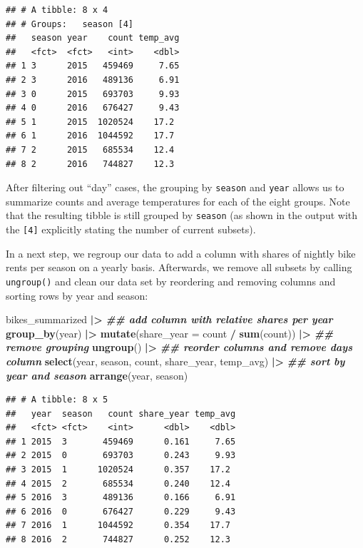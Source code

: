 \documentclass[
]{krantz}
\makeatletter
\newenvironment{Shaded}{\begin{snugshade}}{\end{snugshade}}
\newcommand{\AttributeTok}[1]{\textcolor[rgb]{0.27,0.27,0.27}{#1}}
\newcommand{\DocumentationTok}[1]{\textcolor[rgb]{0.37,0.37,0.37}{\textbf{\textit{#1}}}}
\newcommand{\FunctionTok}[1]{\textcolor[rgb]{0.27,0.27,0.27}{\textbf{#1}}}
\newcommand{\NormalTok}[1]{#1}
\newcommand{\SpecialCharTok}[1]{\textcolor[rgb]{0.43,0.43,0.43}{\textbf{#1}}}
\newenvironment{kframe}{%
\medskip{}
\setlength{\fboxsep}{.8em}
 \def\at@end@of@kframe{}%
 \ifinner\ifhmode%
  \def\at@end@of@kframe{\end{minipage}}%
  \begin{minipage}{\columnwidth}%
 \fi\fi%
 \def\FrameCommand##1{\hskip\@totalleftmargin \hskip-\fboxsep
 \colorbox{shadecolor}{##1}\hskip-\fboxsep
     \hskip-\linewidth \hskip-\@totalleftmargin \hskip\columnwidth}%
 \MakeFramed {\advance\hsize-\width
   \@totalleftmargin\z@ \linewidth\hsize
   \@setminipage}}%
 {\par\unskip\endMakeFramed%
 \at@end@of@kframe}
\renewenvironment{Shaded}{\begin{kframe}}{\end{kframe}}
\makeatother
\begin{document}
\begin{verbatim}
## # A tibble: 8 x 4
## # Groups:   season [4]
##   season year    count temp_avg
##   <fct>  <fct>   <int>    <dbl>
## 1 3      2015   459469     7.65
## 2 3      2016   489136     6.91
## 3 0      2015   693703     9.93
## 4 0      2016   676427     9.43
## 5 1      2015  1020524    17.2 
## 6 1      2016  1044592    17.7 
## 7 2      2015   685534    12.4 
## 8 2      2016   744827    12.3
\end{verbatim}

After filtering out ``day'' cases, the grouping by \texttt{season} and \texttt{year} allows us to summarize counts and average temperatures for each of the eight groups. Note that the resulting tibble is still grouped by \texttt{season} (as shown in the output with the \texttt{{[}4{]}} explicitly stating the number of current subsets).

In a next step, we regroup our data to add a column with shares of nightly bike rents per season on a yearly basis. Afterwards, we remove all subsets by calling \texttt{ungroup()} and clean our data set by reordering and removing columns and sorting rows by year and season:

\begin{Shaded}
\begin{Highlighting}[]
\NormalTok{bikes\_summarized }\SpecialCharTok{|\textgreater{}} 
  \DocumentationTok{\#\# add column with relative shares per year}
  \FunctionTok{group\_by}\NormalTok{(year) }\SpecialCharTok{|\textgreater{}} 
  \FunctionTok{mutate}\NormalTok{(}\AttributeTok{share\_year =}\NormalTok{ count }\SpecialCharTok{/} \FunctionTok{sum}\NormalTok{(count)) }\SpecialCharTok{|\textgreater{}} 
  \DocumentationTok{\#\# remove grouping}
  \FunctionTok{ungroup}\NormalTok{() }\SpecialCharTok{|\textgreater{}} 
  \DocumentationTok{\#\# reorder columns and remove days column}
  \FunctionTok{select}\NormalTok{(year, season, count, share\_year, temp\_avg) }\SpecialCharTok{|\textgreater{}} 
  \DocumentationTok{\#\# sort by year and season}
  \FunctionTok{arrange}\NormalTok{(year, season) }
\end{Highlighting}
\end{Shaded}

\begin{verbatim}
## # A tibble: 8 x 5
##   year  season   count share_year temp_avg
##   <fct> <fct>    <int>      <dbl>    <dbl>
## 1 2015  3       459469      0.161     7.65
## 2 2015  0       693703      0.243     9.93
## 3 2015  1      1020524      0.357    17.2 
## 4 2015  2       685534      0.240    12.4 
## 5 2016  3       489136      0.166     6.91
## 6 2016  0       676427      0.229     9.43
## 7 2016  1      1044592      0.354    17.7 
## 8 2016  2       744827      0.252    12.3
\end{verbatim}
\end{document}

